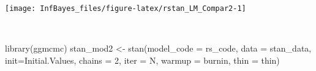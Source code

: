 \documentclass[
]{book}
\newenvironment{Shaded}{\begin{snugshade}}{\end{snugshade}}
\newcommand{\AttributeTok}[1]{\textcolor[rgb]{0.77,0.63,0.00}{#1}}
\newcommand{\DecValTok}[1]{\textcolor[rgb]{0.00,0.00,0.81}{#1}}
\newcommand{\FunctionTok}[1]{\textcolor[rgb]{0.00,0.00,0.00}{#1}}
\newcommand{\NormalTok}[1]{#1}
\newcommand{\OtherTok}[1]{\textcolor[rgb]{0.56,0.35,0.01}{#1}}
\begin{document}
\begin{center}\texttt{[image: InfBayes\_files/figure-latex/rstan\_LM\_Compar2-1]} \end{center}

\(~\)

\begin{Shaded}
\begin{Highlighting}[]
\FunctionTok{library}\NormalTok{(ggmcmc)}
\NormalTok{stan\_mod2 }\OtherTok{\textless{}{-}} \FunctionTok{stan}\NormalTok{(}\AttributeTok{model\_code =}\NormalTok{ rs\_code, }\AttributeTok{data =}\NormalTok{ stan\_data, }\AttributeTok{init=}\NormalTok{Initial.Values,}
            \AttributeTok{chains =} \DecValTok{2}\NormalTok{, }\AttributeTok{iter =}\NormalTok{ N, }\AttributeTok{warmup =}\NormalTok{ burnin, }\AttributeTok{thin =}\NormalTok{ thin)}
\end{Highlighting}
\end{Shaded}
\end{document}
